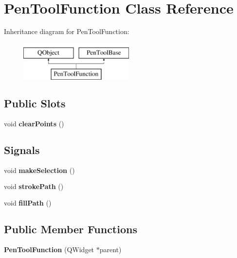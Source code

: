 \hypertarget{class_pen_tool_function}{\section{Pen\-Tool\-Function Class Reference}
\label{class_pen_tool_function}
}
Inheritance diagram for Pen\-Tool\-Function\-:\begin{figure}[H]
\begin{center}
\leavevmode
\includegraphics[height=2.000000cm]{class_pen_tool_function}
\end{center}
\end{figure}
\subsection*{Public Slots}
\begin{DoxyCompactItemize}
\item 
\hypertarget{class_pen_tool_function_ad429ee478c88fbe6fcde019697cef33a}{void {\bfseries clear\-Points} ()}\label{class_pen_tool_function_ad429ee478c88fbe6fcde019697cef33a}

\end{DoxyCompactItemize}
\subsection*{Signals}
\begin{DoxyCompactItemize}
\item 
\hypertarget{class_pen_tool_function_a2ac783638b62266d6a28710df44b9df6}{void {\bfseries make\-Selection} ()}\label{class_pen_tool_function_a2ac783638b62266d6a28710df44b9df6}

\item 
\hypertarget{class_pen_tool_function_aa7f05839c3047455cec70c77d7ca4b64}{void {\bfseries stroke\-Path} ()}\label{class_pen_tool_function_aa7f05839c3047455cec70c77d7ca4b64}

\item 
\hypertarget{class_pen_tool_function_ad7850683e22b794480618b0783dd8860}{void {\bfseries fill\-Path} ()}\label{class_pen_tool_function_ad7850683e22b794480618b0783dd8860}

\end{DoxyCompactItemize}
\subsection*{Public Member Functions}
\begin{DoxyCompactItemize}
\item 
\hypertarget{class_pen_tool_function_a579c797d3acdd3e89b956324c10eee19}{{\bfseries Pen\-Tool\-Function} (Q\-Widget $\ast$parent)}\label{class_pen_tool_function_a579c797d3acdd3e89b956324c10eee19}

\end{DoxyCompactItemize}

